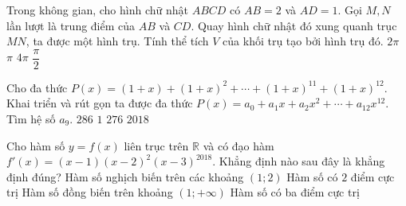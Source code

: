 \begin{ex}%
Trong không gian, cho hình chữ nhật $ABCD$ có $AB=2$ và $AD=1$. Gọi $M, N$ lần lượt là trung điểm của $AB$ và $CD$. Quay hình chữ nhật đó xung quanh trục $MN$, ta được một hình trụ. Tính thể tích $V$ của khối trụ tạo bởi hình trụ đó.
\choice
{ $2\pi $}
{\True $\pi $}
{ $4\pi $}
{ $\dfrac{\pi }{2}$}
\end{ex}
\begin{ex}%
Cho đa thức $P(x)=(1+x)+(1+x)^2+\cdots +(1+x)^{11}+(1+x)^{12}$. Khai triển và rút gọn ta được đa thức $P(x)=a_0+a_1 x+a_2 x^2+\cdots +a_{12} x^{12}$. Tìm hệ số $a_9$.
\choice
{\True $286$}
{ $1$}
{ $276$}
{ $2018$}
\end{ex}
\begin{ex}%
Cho hàm số $y=f(x)$ liên trục trên $\mathbb{R}$ và có đạo hàm $f'(x)=(x-1)(x-2)^2 (x-3)^{2018}$. Khẳng định nào sau đây là khẳng định đúng?
\choice
{ Hàm số nghịch biến trên các khoảng $( 1;2 )$ }
{ Hàm số có $2$ điểm cực trị}
{\True Hàm số đồng biến trên khoảng $(1;+\infty)$}
{ Hàm số có ba điểm cực trị}
\end{ex}
